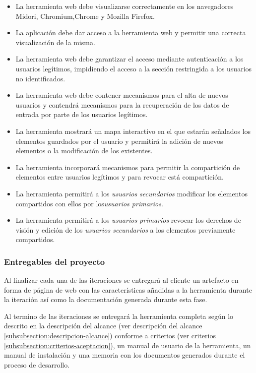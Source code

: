		\begin{itemize}[label={$\bullet$},labelindent=\parindent,leftmargin=2cm]
			\item La herramienta web debe visualizarse correctamente en los navegadores Midori, Chromium,Chrome y Mozilla Firefox.
			\item La aplicación debe dar acceso a la herramienta web y permitir una correcta visualización de la misma.
			\item La herramienta web debe garantizar el acceso mediante autenticación a los usuarios legítimos, impidiendo el acceso a la sección restringida a los usuarios no identificados.
			\item La herramienta web debe contener mecanismos para el alta de nuevos usuarios y contendrá mecanismos para la recuperación de los datos de entrada por parte de los usuarios legítimos.
			\item La herramienta mostrará un mapa interactivo en el que estarán señalados los elementos guardados por el usuario y permitirá la adición de nuevos elementos o la modificación de los existentes.
			\item La herramienta incorporará mecanismos para permitir la compartición de elementos entre usuarios legítimos y para revocar está compartición.
			\item La herramienta permitirá a los \textit{usuarios secundarios} modificar los elementos compartidos con ellos por los\textit{usuarios primarios}.
			\item La herramienta permitirá a los \textit{usuarios primarios} revocar los derechos de visión y edición de los \textit{usuarios secundarios} a los elementos previamente compartidos.
		\end{itemize}

		\subsubsection{Entregables del proyecto}
		Al finalizar cada una de las iteraciones se entregará al cliente un artefacto en forma de página de web con las características añadidas a la herramienta durante la iteración así como la documentación generada durante esta fase.
		
	Al termino de las iteraciones se entregará la herramienta completa según lo descrito en la descripción del alcance (ver descripción del alcance \ref{subsubsection:descripcion-alcance}) conforme a criterios (ver criterios \ref{subsubsection:criterios-aceptacion}), un manual de usuario de la herramienta, un manual de instalación y una memoria con los documentos generados durante el proceso de desarrollo.
	

